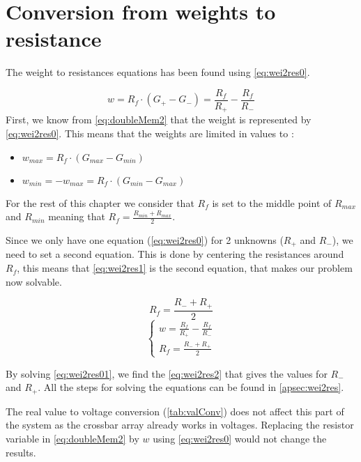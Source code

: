 \section{Conversion from weights to resistance}
\label{sec:wei2res}

The weight to resistances equations has been found using \cref{eq:wei2res0}.

\begin{equation}
  \label{eq:wei2res0}
  w=R_f\cdot( G_+- G_-)=\frac{R_f}{R_+}-\frac{R_f}{R_-}
\end{equation}
First, we know from \cref{eq:doubleMem2} that the weight is represented by \cref{eq:wei2res0}. This means that the weights are limited in values to :

\begin{itemize}
  \item $w_{max}=R_f\cdot( G_{max}- G_{min})$
  \item $w_{min}=-w_{max}=R_f\cdot( G_{min}- G_{max})$
\end{itemize}

For the rest of this chapter we consider that $R_f$ is set to the middle point of $R_{max}$ and $R_{min}$ meaning that $R_f=\frac{R_{min}+R_{max}}{2}$.

Since we only have one equation (\cref{eq:wei2res0}) for 2 unknowns ($R_+$ and $R_-$), we need to set a second equation. This is done by centering the resistances around $R_f$, this means that \cref{eq:wei2res1} is the second equation, that makes our problem now solvable.

\begin{equation}
  \label{eq:wei2res1}
  R_f=\frac{R_-+R_+}{2}
\end{equation}
\begin{equation}
  \label{eq:wei2res01}
  \begin{cases}
    w=\frac{R_f}{R_+}-\frac{R_f}{R_-}\\
    R_f=\frac{R_-+R_+}{2}
  \end{cases}
\end{equation}

By solving \cref{eq:wei2res01}, we find the \cref{eq:wei2res2} that gives the values for $R_-$ and $R_+$. All the steps for solving the equations can be found in \cref{apsec:wei2res}.

The real value to voltage conversion (\cref{tab:valConv}) does not affect this part of the system as the crossbar array already works in voltages. Replacing the resistor variable in \cref{eq:doubleMem2} by $w$ using \cref{eq:wei2res0} would not change the results.

